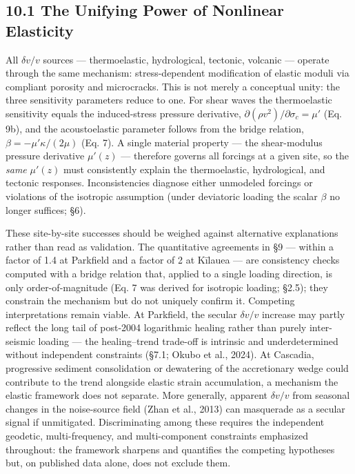 \documentclass[12pt]{article}
\begin{document}
\subsection{10.1 The Unifying Power of Nonlinear
Elasticity}\label{the-unifying-power-of-nonlinear-elasticity}

All \(\delta v/v\) sources --- thermoelastic, hydrological, tectonic,
volcanic --- operate through the same mechanism: stress-dependent
modification of elastic moduli via compliant porosity and microcracks.
This is not merely a conceptual unity: the three sensitivity parameters
reduce to one. For shear waves the thermoelastic sensitivity equals the
induced-stress pressure derivative,
\(\partial(\rho v^2)/\partial\sigma_c = \mu'\) (Eq. 9b), and the
acoustoelastic parameter follows from the bridge relation,
\(\beta = -\mu'\kappa/(2\mu)\) (Eq. 7). A single material property ---
the shear-modulus pressure derivative \(\mu'(z)\) --- therefore governs
all forcings at a given site, so the \emph{same} \(\mu'(z)\) must
consistently explain the thermoelastic, hydrological, and tectonic
responses. Inconsistencies diagnose either unmodeled forcings or
violations of the isotropic assumption (under deviatoric loading the
scalar \(\beta\) no longer suffices; §6).

These site-by-site successes should be weighed against alternative
explanations rather than read as validation. The quantitative agreements
in §9 --- within a factor of 1.4 at Parkfield and a factor of 2 at
Kīlauea --- are consistency checks computed with a bridge relation that,
applied to a single loading direction, is only order-of-magnitude (Eq. 7
was derived for isotropic loading; §2.5); they constrain the mechanism
but do not uniquely confirm it. Competing interpretations remain viable.
At Parkfield, the secular \(\delta v/v\) increase may partly reflect the
long tail of post-2004 logarithmic healing rather than purely
inter-seismic loading --- the healing--trend trade-off is intrinsic and
underdetermined without independent constraints (§7.1; Okubo et al.,
2024). At Cascadia, progressive sediment consolidation or dewatering of
the accretionary wedge could contribute to the trend alongside elastic
strain accumulation, a mechanism the elastic framework does not
separate. More generally, apparent \(\delta v/v\) from seasonal changes
in the noise-source field (Zhan et al., 2013) can masquerade as a
secular signal if unmitigated. Discriminating among these requires the
independent geodetic, multi-frequency, and multi-component constraints
emphasized throughout: the framework sharpens and quantifies the
competing hypotheses but, on published data alone, does not exclude
them.
\end{document}
